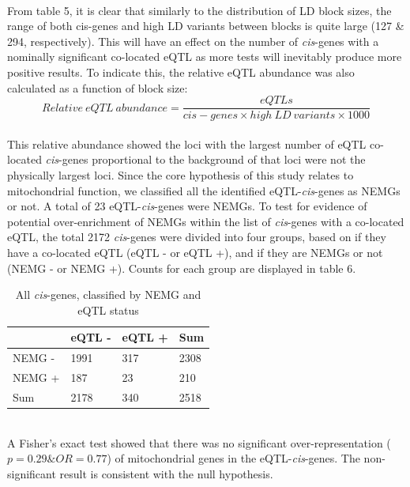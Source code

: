 \documentclass{article}
\begin{document}
\\From table 5, it is clear that similarly to the distribution of LD block sizes, the range of both cis-genes and high LD variants between blocks is quite large (127 \& 294, respectively). This will have an effect on the number of \textit{cis}-genes with a nominally significant co-located eQTL as more tests will inevitably produce more positive results. To indicate this, the relative eQTL abundance was also calculated as a function of block size:
\[ 
Relative\ eQTL\ abundance = \frac{eQTLs}{\textit{cis}-genes \times high\ LD\ variants \times 1000}
\]
\\This relative abundance showed the loci with the largest number of eQTL co-located \textit{cis}-genes proportional to the background of that loci were not the physically largest loci.
\label{fisher1}
Since the core hypothesis of this study relates to mitochondrial function, we classified all the identified eQTL-\textit{cis}-genes as NEMGs or not. A total of 23 eQTL-\textit{cis}-genes were NEMGs. To test for evidence of potential over-enrichment of NEMGs within the list of \textit{cis}-genes with a co-located eQTL, the total 2172 \textit{cis}-genes were divided into four groups, based on if they have a co-located eQTL (eQTL - or eQTL +), and if they are NEMGs or not (NEMG - or NEMG +). Counts for each group are displayed in table 6.
\begin{table}[h]
    \centering
    \caption{All \textit{cis}-genes, classified by NEMG and eQTL status}
    \begin{tabular}{|l|l|l|l|}
        \hline
               & eQTL - & eQTL + & Sum  \\ \hline
        NEMG - &  1991    &  317    & 2308  \\ \hline
        NEMG + & 187   &  23  &  210\\ \hline
        Sum    & 2178   & 340    & 2518 \\ \hline
    \end{tabular}
\end{table}
\\A Fisher's exact test showed that there was no significant over-representation ($p = 0.29 \& OR = 0.77$) of mitochondrial genes in the eQTL-\textit{cis}-genes. The non-significant result is consistent with the null hypothesis. 
\end{document}
